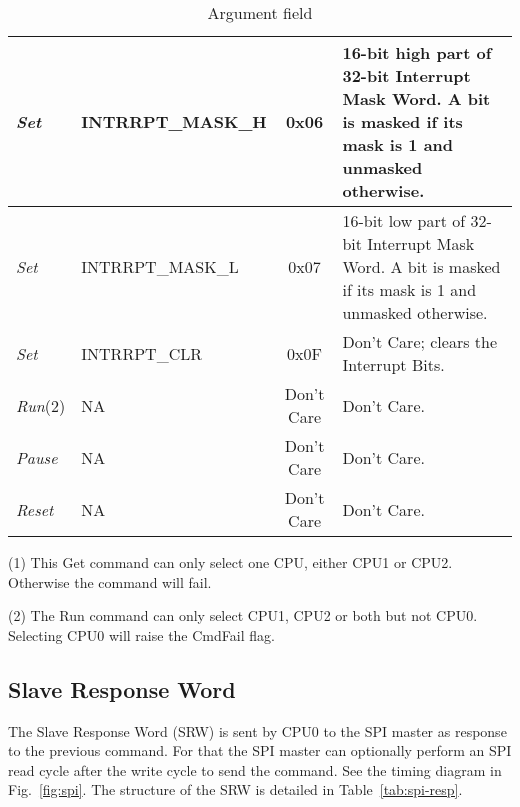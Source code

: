 \documentclass{rep}
\theoremstyle{plain}
\begin{document}
\begin{table}[H]
\begin{center}
\begin{tabular}{|l|l|c|p{7cm}|}
      \rowcolor{iob-blue} \textit{Set} & INTRRPT\_MASK\_H & 0x06 & 16-bit high
      part of 32-bit Interrupt Mask Word. A bit is masked if its mask is 1 and
      unmasked otherwise.\\ \hline

      \textit{Set} & INTRRPT\_MASK\_L & 0x07 & 16-bit low
      part of 32-bit Interrupt Mask Word.  A bit is masked if its mask is 1 and
      unmasked otherwise.\\ \hline

      \rowcolor{iob-blue} \textit{Set} & INTRRPT\_CLR & 0x0F & Don't Care; clears
      the Interrupt Bits.\\ \hline

      \textit{Run}(2) & NA & Don't Care & Don't Care. \\ \hline

      \rowcolor{iob-blue} 
      \textit{Pause} & NA & Don't Care & Don't Care.\\ \hline

      \textit{Reset} & NA & Don't Care & Don't Care.\\ \hline

    \end{tabular}
    \caption{Argument field}
    \label{tab:spi-args}
  \end{center}
  (1) This Get command can only select one CPU, either CPU1 or
  CPU2. Otherwise the command will fail.

  (2) The Run command can only select CPU1, CPU2 or both but not
  CPU0. Selecting CPU0 will raise the CmdFail flag.
\end{table}

\clearpage

\subsection{Slave Response Word}

The Slave Response Word (SRW) is sent by CPU0 to the SPI master as
response to the previous command. For that the SPI master can
optionally perform an SPI read cycle after the write cycle to send the
command. See the timing diagram in Fig.~\ref{fig:spi}. The structure
of the SRW is detailed in Table~\ref{tab:spi-resp}.
\end{document}
